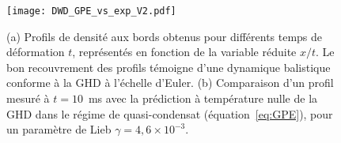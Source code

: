 
\begin{figure}[!htb]
\centering
\texttt{[image: DWD\_GPE\_vs\_exp\_V2.pdf]}
\caption{(a) Profils de densité aux bords obtenus pour différents temps de déformation $t$, représentés en fonction de la variable réduite $x/t$. Le bon recouvrement des profils témoigne d’une dynamique balistique conforme à la GHD à l’échelle d’Euler. (b) Comparaison d’un profil mesuré à $t = 10$~ms avec la prédiction à température nulle de la GHD dans le régime de quasi-condensat (équation~\eqref{eq:GPE}), pour un paramètre de Lieb $\gamma = 4{,}6 \times 10^{-3}$.}%
\label{fig:euler}
\end{figure}

